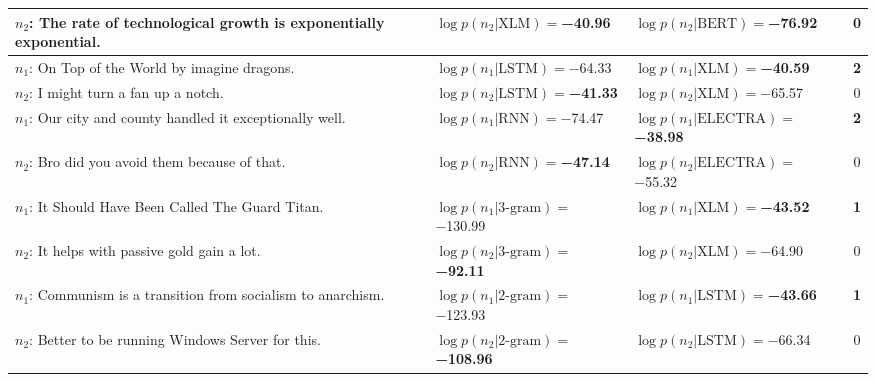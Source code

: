 \begin{tabularx}{\textwidth}{lllc}
 $n_2$: The rate of technological growth is exponentially exponential. &      $\log p(n_2 | \textrm{XLM})=$\textbf{\num{-40.96}} &              $\log p(n_2 | \textrm{BERT})=$\num{-76.92} &           \num{0} \\\midrule
                        $n_1$: On Top of the World by imagine dragons. &              $\log p(n_1 | \textrm{LSTM})=$\num{-64.33} &      $\log p(n_1 | \textrm{XLM})=$\textbf{\num{-40.59}} &  \textbf{\num{2}} \\
                                 $n_2$: I might turn a fan up a notch. &     $\log p(n_2 | \textrm{LSTM})=$\textbf{\num{-41.33}} &               $\log p(n_2 | \textrm{XLM})=$\num{-65.57} &           \num{0} \\\midrule
             $n_1$: Our city and county handled it exceptionally well. &               $\log p(n_1 | \textrm{RNN})=$\num{-74.47} &  $\log p(n_1 | \textrm{ELECTRA})=$\textbf{\num{-38.98}} &  \textbf{\num{2}} \\
                        $n_2$: Bro did you avoid them because of that. &      $\log p(n_2 | \textrm{RNN})=$\textbf{\num{-47.14}} &           $\log p(n_2 | \textrm{ELECTRA})=$\num{-55.32} &           \num{0} \\\midrule
                    $n_1$: It Should Have Been Called The Guard Titan. &           $\log p(n_1 | \textrm{3-gram})=$\num{-130.99} &      $\log p(n_1 | \textrm{XLM})=$\textbf{\num{-43.52}} &  \textbf{\num{1}} \\
                         $n_2$: It helps with passive gold gain a lot. &   $\log p(n_2 | \textrm{3-gram})=$\textbf{\num{-92.11}} &               $\log p(n_2 | \textrm{XLM})=$\num{-64.90} &           \num{0} \\\midrule
         $n_1$: Communism is a transition from socialism to anarchism. &           $\log p(n_1 | \textrm{2-gram})=$\num{-123.93} &     $\log p(n_1 | \textrm{LSTM})=$\textbf{\num{-43.66}} &  \textbf{\num{1}} \\
                  $n_2$: Better to be running Windows Server for this. &  $\log p(n_2 | \textrm{2-gram})=$\textbf{\num{-108.96}} &              $\log p(n_2 | \textrm{LSTM})=$\num{-66.34} &           \num{0} \\
\bottomrule
\end{tabularx}
